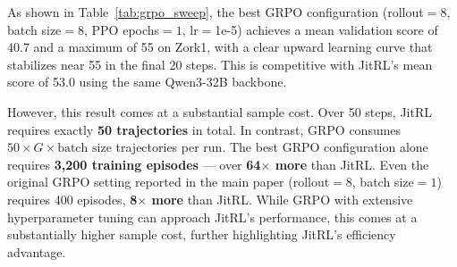 As shown in Table~\ref{tab:grpo_sweep}, the best GRPO configuration (rollout${=}8$, batch size${=}8$, PPO epochs${=}1$, lr${=}$1e-5) achieves a mean validation score of 40.7 and a maximum of 55 on Zork1, with a clear upward learning curve that stabilizes near 55 in the final 20 steps. This is competitive with JitRL's mean score of 53.0 using the same Qwen3-32B backbone.

However, this result comes at a substantial sample cost. Over 50 steps, JitRL requires exactly \textbf{50 trajectories} in total. In contrast, GRPO consumes $50 \times G \times \text{batch size}$ trajectories per run. The best GRPO configuration alone requires \textbf{3,200 training episodes} — over \textbf{64$\times$ more} than JitRL. Even the original GRPO setting reported in the main paper (rollout${=}8$, batch size${=}1$) requires 400 episodes, \textbf{8$\times$ more} than JitRL. While GRPO with extensive hyperparameter tuning can approach JitRL's performance, this comes at a substantially higher sample cost, further highlighting JitRL's efficiency advantage.

